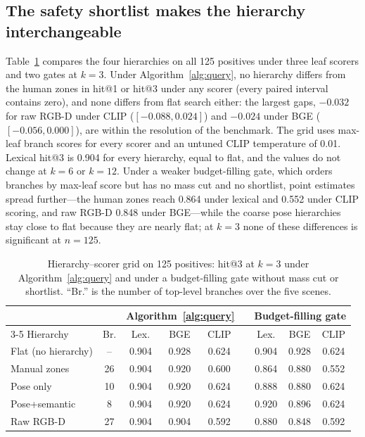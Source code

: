 \documentclass{ieeeaccess}
\begin{document}
\subsection{The safety shortlist makes the hierarchy interchangeable}
\label{sec:hierarchies}
Table~\ref{tab:grid} compares the four hierarchies on all 125 positives under
three leaf scorers and two gates at $k=3$. Under Algorithm~\ref{alg:query}, no
hierarchy differs from the human zones in hit@1 or hit@3 under any scorer (every
paired interval contains zero), and none differs from flat search either: the
largest gaps, $-0.032$ for raw RGB-D under CLIP ($[-0.088,0.024]$) and $-0.024$
under BGE ($[-0.056,0.000]$), are within the resolution of the benchmark. The grid
uses max-leaf branch scores for every scorer and an untuned CLIP temperature of
0.01. Lexical
hit@3 is 0.904 for every hierarchy, equal to flat, and the values do not change at
$k=6$ or $k=12$. Under a weaker budget-filling gate, which orders branches by
max-leaf score but has no mass cut and no shortlist, point estimates spread
further---the human zones reach 0.864 under lexical and 0.552 under CLIP scoring,
and raw RGB-D 0.848 under BGE---while the coarse pose hierarchies stay close to
flat because they are nearly flat; at $k=3$ none of these differences is
significant at $n=125$.

\begin{table}[!t]
\centering
\caption{Hierarchy--scorer grid on 125 positives: hit@3 at $k=3$ under
Algorithm~\ref{alg:query} and under a budget-filling gate without mass cut or
shortlist. ``Br.'' is the number of top-level branches over the five
scenes.}
\label{tab:grid}
\footnotesize
\setlength{\tabcolsep}{2.2pt}
\begin{tabular}{lcccccccc}
\toprule
& & \multicolumn{3}{c}{Algorithm~\ref{alg:query}} & &
\multicolumn{3}{c}{Budget-filling gate} \\
\cmidrule{3-5}\cmidrule{7-9}
Hierarchy & Br. & Lex. & BGE & CLIP & & Lex. & BGE & CLIP \\
\midrule
Flat (no hierarchy) & -- & 0.904 & 0.928 & 0.624 & & 0.904 & 0.928 & 0.624 \\
Manual zones & 26 & 0.904 & 0.920 & 0.600 & & 0.864 & 0.880 & 0.552 \\
Pose only & 10 & 0.904 & 0.920 & 0.624 & & 0.888 & 0.880 & 0.624 \\
Pose+semantic & 8 & 0.904 & 0.920 & 0.624 & & 0.920 & 0.896 & 0.624 \\
Raw RGB-D & 27 & 0.904 & 0.904 & 0.592 & & 0.880 & 0.848 & 0.592 \\
\bottomrule
\end{tabular}
\end{table}
\end{document}
